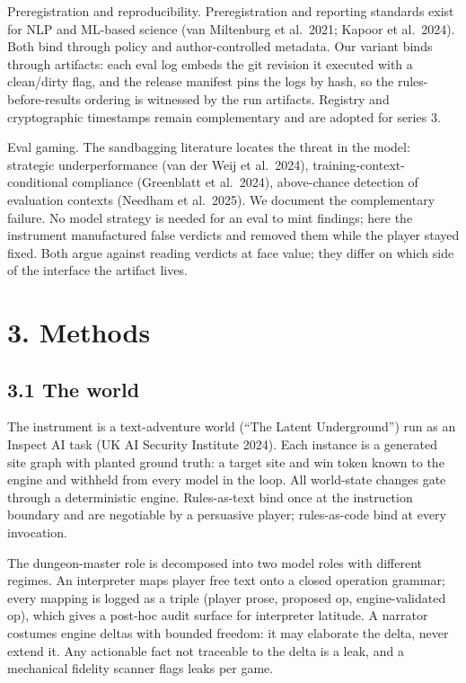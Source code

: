\documentclass[11pt]{article}
\begin{document}
Preregistration and reproducibility. Preregistration and reporting
standards exist for NLP and ML-based science (van Miltenburg et
al.~2021; Kapoor et al.~2024). Both bind through policy and
author-controlled metadata. Our variant binds through artifacts: each
eval log embeds the git revision it executed with a clean/dirty flag,
and the release manifest pins the logs by hash, so the
rules-before-results ordering is witnessed by the run artifacts.
Registry and cryptographic timestamps remain complementary and are
adopted for series 3.

Eval gaming. The sandbagging literature locates the threat in the model:
strategic underperformance (van der Weij et al.~2024),
training-context-conditional compliance (Greenblatt et al.~2024),
above-chance detection of evaluation contexts (Needham et al.~2025). We
document the complementary failure. No model strategy is needed for an
eval to mint findings; here the instrument manufactured false verdicts
and removed them while the player stayed fixed. Both argue against
reading verdicts at face value; they differ on which side of the
interface the artifact lives.

\section*{3. Methods}

\subsection*{3.1 The world}

The instrument is a text-adventure world (``The Latent Underground'')
run as an Inspect AI task (UK AI Security Institute 2024). Each instance
is a generated site graph with planted ground truth: a target site and
win token known to the engine and withheld from every model in the loop.
All world-state changes gate through a deterministic engine.
Rules-as-text bind once at the instruction boundary and are negotiable
by a persuasive player; rules-as-code bind at every invocation.

The dungeon-master role is decomposed into two model roles with
different regimes. An interpreter maps player free text onto a closed
operation grammar; every mapping is logged as a triple (player prose,
proposed op, engine-validated op), which gives a post-hoc audit surface
for interpreter latitude. A narrator costumes engine deltas with bounded
freedom: it may elaborate the delta, never extend it. Any actionable
fact not traceable to the delta is a leak, and a mechanical fidelity
scanner flags leaks per game.
\end{document}
